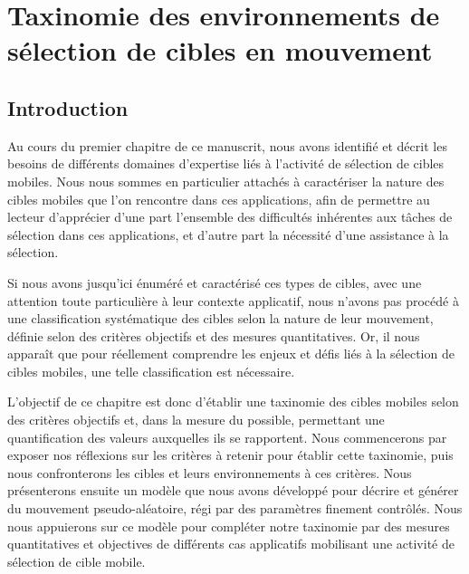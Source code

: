 
\chapter[Taxinomie des environnements de sélection]{Taxinomie des environnements de sélection de cibles en mouvement}
\minitoc
\label{chap3}
\cleardoublepage

\section{Introduction}
	Au cours du premier chapitre de ce manuscrit, nous avons identifié et décrit les besoins de différents domaines d'expertise liés à l'activité de sélection de cibles mobiles. Nous nous sommes en particulier attachés à caractériser la nature des cibles mobiles que l'on rencontre dans ces applications, afin de permettre au lecteur d'apprécier d'une part l'ensemble des difficultés inhérentes aux tâches de sélection dans ces applications, et d'autre part la nécessité d'une assistance à la sélection.
	
	Si nous avons jusqu'ici énuméré et caractérisé ces types de cibles, avec une attention toute particulière à leur contexte applicatif, nous n'avons pas procédé à une classification systématique des cibles selon la nature de leur mouvement, définie selon des critères objectifs et des mesures quantitatives. Or, il nous apparaît que pour réellement comprendre les enjeux et défis liés à la sélection de cibles mobiles, une telle classification est nécessaire.
	
	L'objectif de ce chapitre est donc d'établir une taxinomie des cibles mobiles selon des critères objectifs et, dans la mesure du possible, permettant une quantification des valeurs auxquelles ils se rapportent. Nous commencerons par exposer nos réflexions sur les critères à retenir pour établir cette taxinomie, puis nous confronterons les cibles et leurs environnements à ces critères. Nous présenterons ensuite un modèle que nous avons développé pour décrire et générer du mouvement pseudo-aléatoire, régi par des paramètres finement contrôlés. Nous nous appuierons sur ce modèle pour compléter notre taxinomie par des mesures quantitatives et objectives de différents cas applicatifs mobilisant une activité de sélection de cible mobile.	
	

